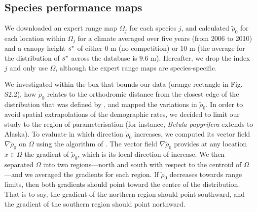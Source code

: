 \subsection{Species performance maps}
We downloaded an expert range map $ \Omega_j $ \citep{Prasad2003, Little1971} for each species $ j $, and calculated $ \tilde \rho_0 $ for each location within $ \Omega_j $ for a climate averaged over five years (from 2006 to 2010) and a canopy height $ {s}^{*} $ of either $ 0 $ m (no competition) or $ 10 $ m (the average for the distribution of $ {s}^{*} $ across the database is $ 9.6 $ m). Hereafter, we drop the index $ j $ and only use $ \Omega $, although the expert range maps are species-specific.

We investigated within the box that bounds our data (orange rectangle in Fig. S2.2), how $ \tilde \rho_0 $ relates to the orthodromic distance from the closest edge of the distribution that was defined by \citet{Little1971}, and mapped the variations in $ \tilde \rho_0 $. In order to avoid spatial extrapolations of the demographic rates, we decided to limit our study to the region of parameterisation (for instance, \textit{Betula papyrifera} extends to Alaska). To evaluate in which direction $ \tilde \rho_0 $ increases, we computed its vector field $ \nabla \tilde \rho_0 $ on $ \Omega $ using the algorithm of \citet{Ritter1987}. The vector field $ \nabla \tilde \rho_0 $ provides at any location $ x \in \Omega $ the gradient of $ \tilde \rho_0 $, which is its local direction of increase. We then separated $ \Omega $ into two regions---north and south with respect to the centroid of $ \Omega $---and we averaged the gradients for each region. If $ \tilde \rho_0 $ decreases towards range limits, then both gradients should point toward the centre of the distribution. That is to say, the gradient of the northern region should point southward, and the gradient of the southern region should point northward. \\

